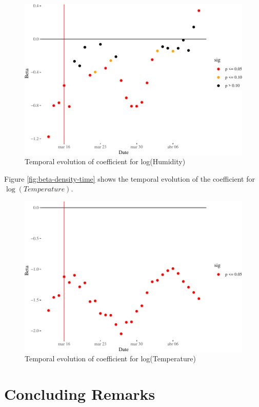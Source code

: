 \documentclass[]{elsarticle} %
\makeatletter
\def\maxwidth{\ifdim\Gin@nat@width>\linewidth\linewidth
\else\Gin@nat@width\fi}
\let\Oldincludegraphics\includegraphics
\renewcommand{\includegraphics}[1]{\Oldincludegraphics[width=\maxwidth]{#1}}
\makeatother
\begin{document}
\begin{figure}
\centering
\includegraphics{Environmental-Correlates-of-COVID19-Spain_files/figure-latex/beta-humidity-time-1.pdf}
\caption{\label{fig:beta-humidity-time}Temporal evolution of coefficient
for log(Humidity)}
\end{figure}

Figure \ref{fig:beta-density-time} shows the temporal evolution of the
coefficient for \(\log(Temperature)\).

\begin{figure}
\centering
\includegraphics{Environmental-Correlates-of-COVID19-Spain_files/figure-latex/beta-temperature-time-1.pdf}
\caption{\label{fig:beta-temperature-time}Temporal evolution of
coefficient for log(Temperature)}
\end{figure}

\hypertarget{concluding-remarks}{%
\section{Concluding Remarks}\label{concluding-remarks}}
\end{document}

